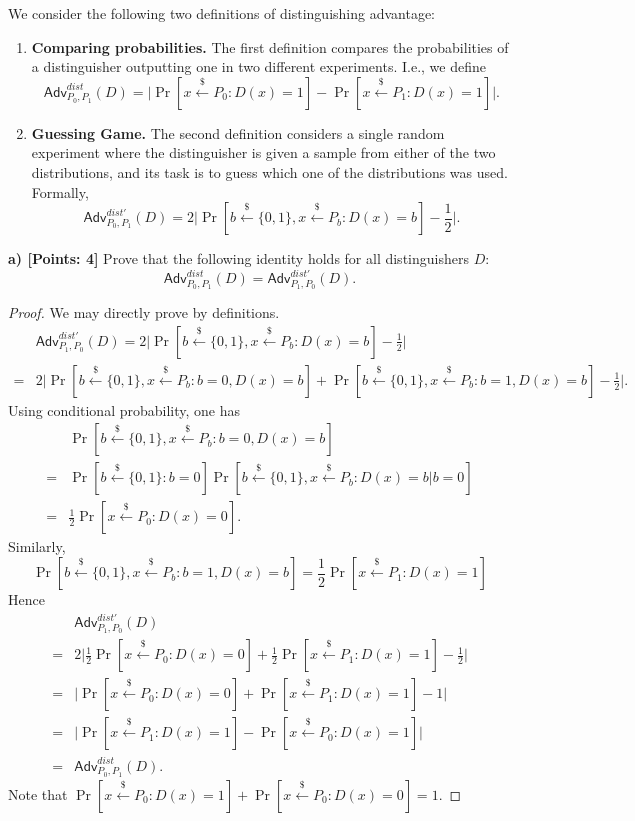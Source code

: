 \documentclass[12pt]{article}
\newcommand{\bits}{\{0,1\}}
\newcommand{\getsr}{\stackrel{\$}{\gets}}
\newcommand{\Adv}{\textsf{Adv}}
\theoremstyle{definition}
\begin{document}
We consider the following two definitions of distinguishing advantage:
\begin{enumerate}
\item {\bf Comparing probabilities.} The first definition compares the probabilities of a distinguisher
outputting one in two different experiments. I.e., we define
$$\Adv_{P_0,P_1}^{dist}(D) = \bigg| \Pr[x\getsr P_0: D(x)=1] - \Pr[x\getsr P_1: D(x)=1] \bigg|.$$
\item {\bf Guessing Game.} The second definition considers a single random experiment where
the distinguisher is given a sample from either of the two distributions, and its task
is to guess which one of the distributions was used. Formally,
$$\Adv_{P_0, P_1}^{dist'}(D) = 2\bigg| \Pr[b \getsr \bits, x\getsr P_b: D(x)=b] -\frac{1}{2} \bigg|.$$
\end{enumerate}
{\bf a) [Points: 4]} Prove that the following identity holds for all distinguishers $D$:
$$\Adv_{P_0,P_1}^{dist}(D) = \Adv_{P_1,P_0}^{dist'}(D).$$
\begin{proof}
We may directly prove by definitions.
$$\begin{aligned}
&\Adv_{P_1, P_0}^{dist'}(D) = 2\bigg| \Pr[b \getsr \bits, x\getsr P_b: D(x)=b] -\frac{1}{2} \bigg| \\
=& 2\bigg| \Pr[b \getsr \bits, x\getsr P_b: b=0, D(x)=b] + \Pr[b \getsr \bits, x\getsr P_b: b=1, D(x)=b] -\frac{1}{2} \bigg|.
\end{aligned}
$$
Using conditional probability, one has 
$$\begin{aligned}
& \Pr[b \getsr \bits, x\getsr P_b: b=0, D(x)=b] \\
=& \Pr[b \getsr \bits : b=0] \Pr[b \getsr \bits, x\getsr P_b: D(x)=b | b=0] \\
=& \frac{1}{2} \Pr[x\getsr P_0: D(x)=0].
\end{aligned}$$
Similarly, 
$$\Pr[b \getsr \bits, x\getsr P_b: b=1, D(x)=b] = \frac{1}{2} \Pr[x\getsr P_1: D(x)=1]$$
Hence
$$\begin{aligned}
&\Adv_{P_1, P_0}^{dist'}(D) \\
=& 2\bigg| \frac{1}{2} \Pr[x\getsr P_0: D(x)=0] + \frac{1}{2} \Pr[x\getsr P_1: D(x)=1] -\frac{1}{2} \bigg| \\
=& \bigg| \Pr[x\getsr P_0: D(x)=0] + \Pr[x\getsr P_1: D(x)=1] -1 \bigg| \\
=& \bigg| \Pr[x\getsr P_1: D(x)=1] - \Pr[x\getsr P_0: D(x)=1] \bigg| \\
=& \Adv_{P_0,P_1}^{dist}(D).
\end{aligned}
$$
Note that $\Pr[x\getsr P_0: D(x)=1] + \Pr[x\getsr P_0: D(x)=0] = 1$.
\end{proof}
\end{document}

